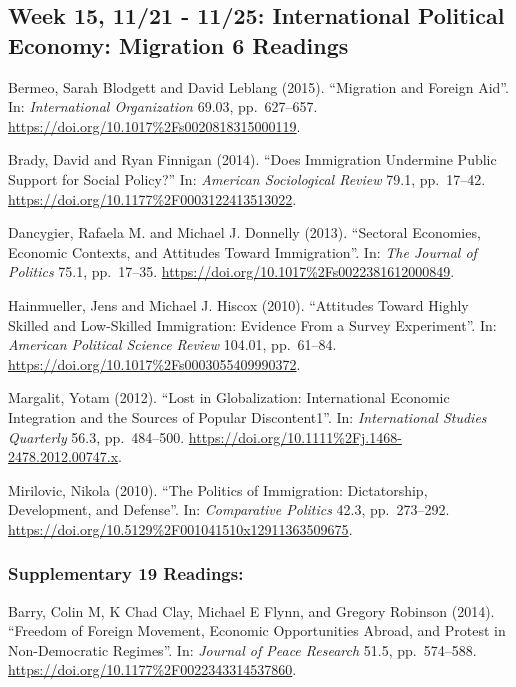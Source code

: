 \documentclass[10pt,]{article}
\begin{document}
\subsection{Week 15, 11/21 - 11/25: International Political Economy:
Migration \textbar{} 6
Readings}\label{week-15-1121---1125-international-political-economy-migration-6-readings}

Bermeo, Sarah Blodgett and David Leblang (2015). ``Migration and Foreign
Aid''. In: \emph{International Organization} 69.03, pp.~627--657.
\url{https://doi.org/10.1017\%2Fs0020818315000119}.

Brady, David and Ryan Finnigan (2014). ``Does Immigration Undermine
Public Support for Social Policy?'' In:
\emph{American Sociological Review} 79.1, pp.~17--42.
\url{https://doi.org/10.1177\%2F0003122413513022}.

Dancygier, Rafaela M. and Michael J. Donnelly (2013). ``Sectoral
Economies, Economic Contexts, and Attitudes Toward Immigration''. In:
\emph{The Journal of Politics} 75.1, pp.~17--35.
\url{https://doi.org/10.1017\%2Fs0022381612000849}.

Hainmueller, Jens and Michael J. Hiscox (2010). ``Attitudes Toward
Highly Skilled and Low-Skilled Immigration: Evidence From a Survey
Experiment''. In: \emph{American Political Science Review} 104.01,
pp.~61--84. \url{https://doi.org/10.1017\%2Fs0003055409990372}.

Margalit, Yotam (2012). ``Lost in Globalization: International Economic
Integration and the Sources of Popular Discontent1''. In:
\emph{International Studies Quarterly} 56.3, pp.~484--500.
\url{https://doi.org/10.1111\%2Fj.1468-2478.2012.00747.x}.

Mirilovic, Nikola (2010). ``The Politics of Immigration: Dictatorship,
Development, and Defense''. In: \emph{Comparative Politics} 42.3,
pp.~273--292. \url{https://doi.org/10.5129\%2F001041510x12911363509675}.

\subsubsection{Supplementary \textbar{} 19
Readings:}\label{supplementary-19-readings}

Barry, Colin M, K Chad Clay, Michael E Flynn, and Gregory Robinson
(2014). ``Freedom of Foreign Movement, Economic Opportunities Abroad,
and Protest in Non-Democratic Regimes''. In:
\emph{Journal of Peace Research} 51.5, pp.~574--588.
\url{https://doi.org/10.1177\%2F0022343314537860}.
\end{document}
